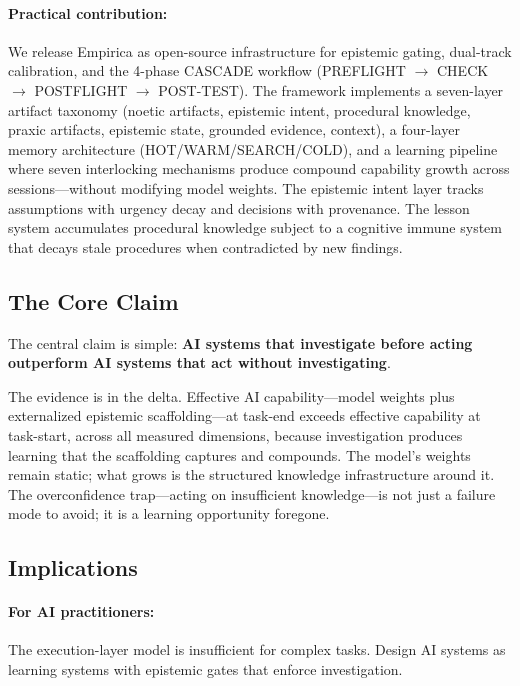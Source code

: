 \paragraph{Practical contribution:} We release Empirica as open-source infrastructure for epistemic gating, dual-track calibration, and the 4-phase CASCADE workflow (PREFLIGHT $\rightarrow$ CHECK $\rightarrow$ POSTFLIGHT $\rightarrow$ POST-TEST). The framework implements a seven-layer artifact taxonomy (noetic artifacts, epistemic intent, procedural knowledge, praxic artifacts, epistemic state, grounded evidence, context), a four-layer memory architecture (HOT/WARM/SEARCH/COLD), and a learning pipeline where seven interlocking mechanisms produce compound capability growth across sessions---without modifying model weights. The epistemic intent layer tracks assumptions with urgency decay and decisions with provenance. The lesson system accumulates procedural knowledge subject to a cognitive immune system that decays stale procedures when contradicted by new findings.

\subsection{The Core Claim}

The central claim is simple: \textbf{AI systems that investigate before acting outperform AI systems that act without investigating}.

The evidence is in the delta. Effective AI capability---model weights plus externalized epistemic scaffolding---at task-end exceeds effective capability at task-start, across all measured dimensions, because investigation produces learning that the scaffolding captures and compounds. The model's weights remain static; what grows is the structured knowledge infrastructure around it. The overconfidence trap---acting on insufficient knowledge---is not just a failure mode to avoid; it is a learning opportunity foregone.

\subsection{Implications}

\paragraph{For AI practitioners:} The execution-layer model is insufficient for complex tasks. Design AI systems as learning systems with epistemic gates that enforce investigation.

